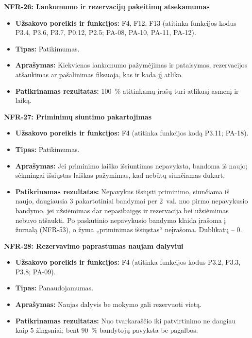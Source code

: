 \noindent\textbf{NFR-26: Lankomumo ir rezervacijų pakeitimų atsekamumas}
\begin{itemize}
    \item \textbf{Užsakovo poreikis ir funkcijos:} F4, F12, F13 (atitinka funkcijos kodus P3.4, P3.6, P3.7, P0.12, P2.5; PA-08, PA-10, PA-11, PA-12).
    \item \textbf{Tipas:} Patikimumas.
    \item \textbf{Aprašymas:} Kiekvienas lankomumo pažymėjimas ir pataisymas, rezervacijos atšaukimas ar pašalinimas fiksuoja, kas ir kada jį atliko.
    \item \textbf{Patikrinamas rezultatas:} 100~\% atitinkamų įrašų turi atlikusį asmenį ir laiką.
\end{itemize}

\noindent\textbf{NFR-27: Priminimų siuntimo pakartojimas}
\begin{itemize}
    \item \textbf{Užsakovo poreikis ir funkcijos:} F4 (atitinka funkcijos kodą P3.11; PA-18).
    \item \textbf{Tipas:} Patikimumas.
    \item \textbf{Aprašymas:} Jei priminimo laiško išsiuntimas nepavyksta, bandoma iš naujo; sėkmingai išsiųstas laiškas pažymimas, kad nebūtų siunčiamas dukart.
    \item \textbf{Patikrinamas rezultatas:} Nepavykus išsiųsti priminimo, siunčiama iš naujo, daugiausia 3 pakartotiniai bandymai per 2~val. nuo pirmo nepavykusio bandymo, jei užsiėmimas dar nepasibaigęs ir rezervacija bei užsiėmimas nebuvo atšaukti. Po paskutinio nepavykusio bandymo klaida įrašoma į žurnalą (NFR-53), o žyma „priminimas išsiųstas“ neįrašoma. Dublikatų -- 0.
\end{itemize}

\noindent\textbf{NFR-28: Rezervavimo paprastumas naujam dalyviui}
\begin{itemize}
    \item \textbf{Užsakovo poreikis ir funkcijos:} F4 (atitinka funkcijos kodus P3.2, P3.3, P3.8; PA-09).
    \item \textbf{Tipas:} Panaudojamumas.
    \item \textbf{Aprašymas:} Naujas dalyvis be mokymo gali rezervuoti vietą.
    \item \textbf{Patikrinamas rezultatas:} Nuo tvarkaraščio iki patvirtinimo ne daugiau kaip 5 žingsniai; bent 90~\% bandytojų pavyksta be pagalbos.
\end{itemize}

